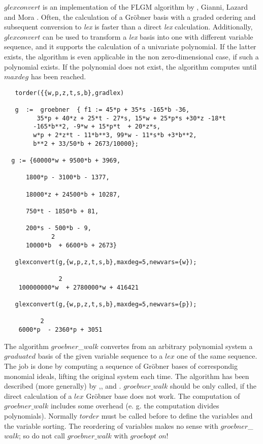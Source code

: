 $glexconvert$ is an implementation of the FLGM algorithm by
, {\sc Gianni}, {\sc Lazard} and {\sc
Mora} \cite{Faugere:89}. Often, the calculation of a Gr\"obner basis
with a graded ordering and subsequent conversion to {\it lex} is
faster than a direct {\it lex} calculation. Additionally, $glexconvert$
can be used to transform a {\it lex} basis into one with different
variable sequence, and it supports the calculation of a univariate
polynomial. If the latter exists, the algorithm is even applicable in
the non zero-dimensional case, if such a polynomial exists.
If the polynomial does not exist, the algorithm computes  until $maxdeg$
has been reached.
\begin{verbatim}
   torder({{w,p,z,t,s,b},gradlex)

   g  :=  groebner  { f1 := 45*p + 35*s -165*b -36,
         35*p + 40*z + 25*t - 27*s, 15*w + 25*p*s +30*z -18*t
        -165*b**2, -9*w + 15*p*t  + 20*z*s,
        w*p + 2*z*t - 11*b**3, 99*w - 11*s*b +3*b**2,
        b**2 + 33/50*b + 2673/10000};

  g := {60000*w + 9500*b + 3969,

      1800*p - 3100*b - 1377,

      18000*z + 24500*b + 10287,

      750*t - 1850*b + 81,

      200*s - 500*b - 9,
             2
      10000*b  + 6600*b + 2673}

   glexconvert(g,{w,p,z,t,s,b},maxdeg=5,newvars={w});

               2
    100000000*w  + 2780000*w + 416421

   glexconvert(g,{w,p,z,t,s,b},maxdeg=5,newvars={p});

          2
    6000*p  - 2360*p + 3051

\end{verbatim}

The algorithm $groebner$\_$walk$ convertes from an arbitrary polynomial
system a $graduated$ basis of the given variable sequence to a $lex$ one
of the same sequence. The job is done by computing a sequence
of Gr\"obner bases of correspondig monomial ideals, lifting the original
system each time. The algorithm has been described (more generally) by
\cite{AGK:961},\cite{AGK:962},\cite{AG:98} and \cite{CKM:97}.
$groebner\_walk$ should be only called, if the direct calculation of a
$lex$ Gr\"obner base does not work. The computation of $groebner\_walk$
includes some overhead (e. g. the computation divides polynomials).
Normally $torder$ must be called before to define the variables and the variable
sorting. The reordering of variables makes no sense with $groebner$\_$walk$;
so do not call $groebner\_walk$ with $groebopt$ $on$!

